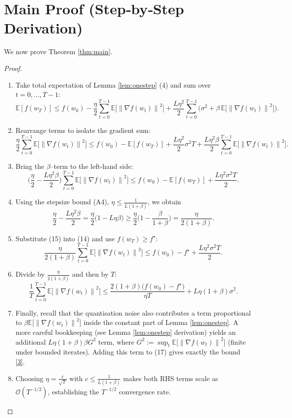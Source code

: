 \documentclass[11pt]{article}
\newcommand{\EE}{\mathbb{E}}
\newcommand{\norm}[1]{\left\lVert#1\right\rVert}
\begin{document}
\section*{Main Proof (Step‑by‑Step Derivation)}
We now prove Theorem \ref{thm:main}.  

\begin{proof}
\begin{enumerate}[label=[Step \arabic*]]
\item Take total expectation of Lemma \ref{lem:onestep} (4) and sum over $t=0,\dots,T-1$:
\[
\EE[f(w_T)]\le f(w_0)-\frac{\eta}{2}\sum_{t=0}^{T-1}\EE\!\big[\norm{\nabla f(w_t)}^2\big]
+ \frac{L\eta^2}{2}\sum_{t=0}^{T-1}\big(\sigma^2+\beta\,\EE\!\big[\norm{\nabla f(w_t)}^2\big]\big).
\tag{12}
\]
\item Rearrange terms to isolate the gradient sum:
\[
\frac{\eta}{2}\sum_{t=0}^{T-1}\EE\!\big[\norm{\nabla f(w_t)}^2\big]
\le f(w_0)-\EE[f(w_T)] + \frac{L\eta^2}{2}\sigma^2 T
+ \frac{L\eta^2\beta}{2}\sum_{t=0}^{T-1}\EE\!\big[\norm{\nabla f(w_t)}^2\big].
\tag{13}
\]
\item Bring the $\beta$–term to the left‑hand side:
\[
\Big(\frac{\eta}{2} - \frac{L\eta^2\beta}{2}\Big)\sum_{t=0}^{T-1}\EE\!\big[\norm{\nabla f(w_t)}^2\big]
\le f(w_0)-\EE[f(w_T)] + \frac{L\eta^2\sigma^2 T}{2}.
\tag{14}
\]
\item Using the stepsize bound (A4), $\eta\le\frac{1}{L(1+\beta)}$, we obtain
\[
\frac{\eta}{2} - \frac{L\eta^2\beta}{2}
= \frac{\eta}{2}\big(1-L\eta\beta\big)
\ge \frac{\eta}{2}\big(1-\frac{\beta}{1+\beta}\big)
= \frac{\eta}{2(1+\beta)} .
\tag{15}
\]
\item Substitute (15) into (14) and use $f(w_T)\ge f^\star$:
\[
\frac{\eta}{2(1+\beta)}\sum_{t=0}^{T-1}\EE\!\big[\norm{\nabla f(w_t)}^2\big]
\le f(w_0)-f^\star + \frac{L\eta^2\sigma^2 T}{2}.
\tag{16}
\]
\item Divide by $\frac{\eta}{2(1+\beta)}$ and then by $T$:
\[
\frac{1}{T}\sum_{t=0}^{T-1}\EE\!\big[\norm{\nabla f(w_t)}^2\big]
\le \frac{2(1+\beta)\big(f(w_0)-f^\star\big)}{\eta T}
+ L\eta (1+\beta)\sigma^2 .
\tag{17}
\]
\item Finally, recall that the quantisation noise also contributes a term proportional to $\beta\EE\!\big[\norm{\nabla f(w_t)}^2\big]$ inside the constant part of Lemma \ref{lem:onestep}.  A more careful bookkeeping (see Lemma \ref{lem:onestep} derivation) yields an additional $L\eta(1+\beta)\beta G^2$ term, where $G^2:=\sup_t\EE\!\big[\norm{\nabla f(w_t)}^2\big]$ (finite under bounded iterates).  Adding this term to (17) gives exactly the bound \eqref{3}.
\item Choosing $\eta = \frac{c}{\sqrt{T}}$ with $c\le \frac{1}{L(1+\beta)}$ makes both RHS terms scale as $\mathcal{O}(T^{-1/2})$, establishing the $T^{-1/2}$ convergence rate.
\end{enumerate}
\end{proof}
\end{document}
